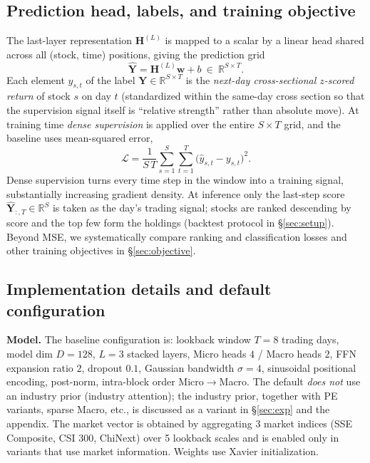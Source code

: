 \documentclass[a4paper,11pt]{article}
\begin{document}
\subsection{Prediction head, labels, and training objective}\label{sec:m-head}
The last-layer representation $\bm{H}^{(L)}$ is mapped to a scalar by a linear
head shared across all (stock, time) positions, giving the prediction grid
\begin{equation}\label{eq:head}
\hat{\bm{Y}} = \bm{H}^{(L)}\bm{w} + b\ \in\ \mathbb{R}^{S\times T}.
\end{equation}
Each element $y_{s,t}$ of the label $\bm{Y}\in\mathbb{R}^{S\times T}$ is the
\emph{next-day cross-sectional $z$-scored return} of stock $s$ on day $t$
(standardized within the same-day cross section so that the supervision signal
itself is ``relative strength'' rather than absolute move). At training time
\emph{dense supervision} is applied over the entire $S\times T$ grid, and the
baseline uses mean-squared error,
\begin{equation}\label{eq:loss}
\mathcal{L}=\frac{1}{S\,T}\sum_{s=1}^{S}\sum_{t=1}^{T}\big(\hat{y}_{s,t}-y_{s,t}\big)^2 .
\end{equation}
Dense supervision turns every time step in the window into a training signal,
substantially increasing gradient density. At inference only the last-step
score $\hat{\bm{Y}}_{:,T}\in\mathbb{R}^{S}$ is taken as the day's trading
signal; stocks are ranked descending by score and the top few form the holdings
(backtest protocol in \S\ref{sec:setup}). Beyond MSE, we systematically compare
ranking and classification losses and other training objectives in
\S\ref{sec:objective}.

\subsection{Implementation details and default configuration}\label{sec:m-impl}
\textbf{Model.} The baseline configuration is: lookback window $T{=}8$
trading days, model dim $D{=}128$, $L{=}3$ stacked layers, Micro heads $4$ /
Macro heads $2$, FFN expansion ratio $2$, dropout $0.1$, Gaussian bandwidth
$\sigma{=}4$, sinusoidal positional encoding, post-norm, intra-block order
Micro$\to$Macro. The default \emph{does not} use an industry prior (industry
attention); the industry prior, together with PE variants, sparse Macro, etc.,
is discussed as a variant in \S\ref{sec:exp} and the appendix. The market vector
is obtained by aggregating 3 market indices (SSE Composite, CSI 300, ChiNext)
over 5 lookback scales and is enabled only in variants that use market
information. Weights use Xavier initialization.
\end{document}
